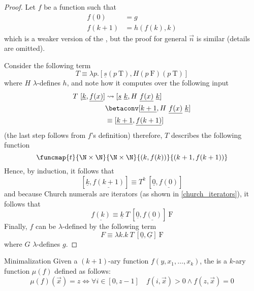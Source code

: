 \documentclass[a4paper, 12pt]{report}
\begin{document}
    \begin{proof}
        Let $f$ be a function such that
        \begin{equation*}
            \begin{split}
                f(0) &= g \\
                f(k + 1) &= h(f(k), k)
            \end{split}
        \end{equation*}
        which is a weaker version of the , but the proof for general $\vec n$ is similar (details are omitted).

        Consider the following term $$T \equiv \lambda p. [\underline s (p \ \mathrm T), H(p \ \mathrm F)  (p \ \mathrm T)]$$ where $H$ $\lambda$-defines $h$, and note how it computes over the following input
        \begin{equation*}
            \begin{split}
                T \ [\underline k, \underline{f(x)}] &\leadsto [\underline s \ \underline k, H \ \underline{f(x)} \ \underline k] \\
                                                     &\betaconv [\underline{k +1}, H \ \underline{f(x)} \ \underline k] \\
                                                     &\equiv [\underline{k + 1}, \underline{f(k +1)}]
            \end{split}
        \end{equation*}
        (the last step follows from $f$'s definition) therefore, $T$ describes the following function $$\funcmap{t}{\N \times \N}{\N \times \N}{(k, f(k))}{(k + 1, f(k + 1))}$$ Hence, by induction, it follows that $$[\underline k, \underline{f(k + 1)}] \equiv T^k \ [\underline 0, \underline{f(0)}]$$ and because Church numerals are iterators (as shown in \cref{church_iterators}), it follows that $$\underline{f(k)} \equiv \underline k \ T \ [\underline 0, \underline{f(0)}] \ \mathrm F$$ Finally, $f$ can be $\lambda$-defined by the following term $$F \equiv \lambda k. k \ T \ [\underline 0, \underline G] \ \mathrm F$$ where $G$ $\lambda$-defines $g$.
    \end{proof}

    \begin{frameddefn}{Minimalization}
        Given a $(k + 1)$-ary function $f(y, x_1, \ldots, x_k)$, the  is a $k$-ary function $\mu(f)$ defined as follows: $$\mu(f)(\vec x) = z \iff \forall i \in [0, z - 1] \quad f(i, \vec x) > 0 \land f(z, \vec x) = 0$$
    \end{frameddefn}
\end{document}

